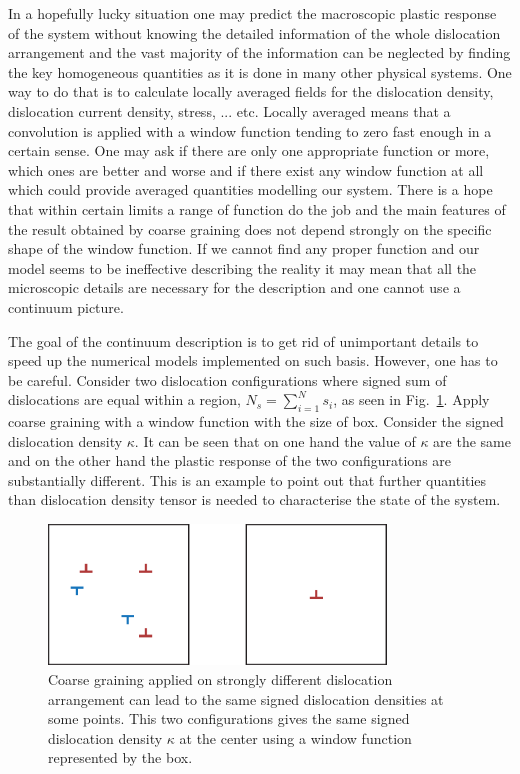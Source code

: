 In a hopefully lucky situation one may predict the macroscopic plastic response of the system without knowing the detailed information of the whole dislocation arrangement and the vast majority of the information can be neglected by finding the key homogeneous quantities as it is done in many other physical systems. One way to do that is to calculate locally averaged fields for the dislocation density, dislocation current density, stress, ... etc. Locally averaged means that a convolution is applied with a window function tending to zero fast enough in a certain sense. One may ask if there are only one appropriate function or more, which ones are better and worse and if there exist any window function at all which could provide averaged quantities modelling our system. There is a hope that within certain limits a range of function do the job and the main features of the result obtained by coarse graining does not depend strongly on the specific shape of the window function. If we cannot find any proper function and our model seems to be ineffective describing the reality it may mean that all the microscopic details are necessary for the description and one cannot use a continuum picture.

The goal of the continuum description is to get rid of unimportant details to speed up the numerical models implemented on such basis. However, one has to be careful. Consider two dislocation configurations where signed sum of dislocations are equal within a region, ${N_s} = \sum\limits_{i = 1}^N {{s_i}} $, as seen in Fig.~\ref{fig:coarse_graining}. Apply coarse graining with a window function with the size of box. Consider the signed dislocation density $\kappa$. It can be seen that on one hand the value of $\kappa$ are the same and on the other hand the plastic response of the two configurations are substantially different. This is an example to point out that further quantities than dislocation density tensor is needed to characterise the state of the system.

\begin{figure}[htbp!] 
\centering    
\includegraphics[width=0.8\textwidth]{coarse_graining}
\caption[Coarse graining is riskful]{Coarse graining applied on strongly different dislocation arrangement can lead to the same signed dislocation densities at some points. This two configurations gives the same signed dislocation density $\kappa$ at the center using a window function represented by the box.}
\label{fig:coarse_graining}
\end{figure}


